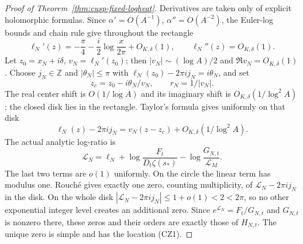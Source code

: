 \documentclass[11pt]{article}
\theoremstyle{remark}\newtheorem{remark}[theorem]{Remark}
\begin{document}
\begin{proof}[Proof of Theorem~\ref{thm:cusp-fixed-logheat}]
Derivatives are taken only of explicit holomorphic formulas.
Since $\alpha'=O(A^{-1})$, $\alpha''=O(A^{-2})$, the Euler-log
bounds and chain rule give throughout the rectangle
\[
 \ell_N'(z)=-\frac\pi4-\frac i2\log\frac{x}{2\pi}+O_{K,\delta}(1),
 \qquad \ell_N''(z)=O_{K,\delta}(1).                   \tag{PHD}
\]
Let $z_0=x_N+i\delta$, $v_N=\ell_N'(z_0)$; then
$|v_N|\sim(\log A)/2$ and $\Re v_N=O_{K,\delta}(1)$.
Choose $j_N\in\mathbb Z$ and $|\theta_N|\le\pi$ with
$\ell_N(z_0)-2\pi i j_N=i\theta_N$, and set
\[
 z_c=z_0-i\theta_N/v_N,\qquad r_N=1/|v_N|.
\]
The real center shift is $O(1/\log A)$ and its imaginary shift
is $O_{K,\delta}(1/\log^2 A)$; the closed disk lies in the rectangle.
Taylor's formula gives uniformly on that disk
\[
 \ell_N(z)-2\pi i j_N=v_N(z-z_c)+O_{K,\delta}(1/\log^2 A).
\]
The actual analytic log-ratio is
\[
 \mathcal L_N=\ell_N+
       \log\frac{F_t}{D_t\zeta(s_*)}
       -\log\frac{G_{N,t}}{\mathcal L_M}.
\]
The last two terms are $o(1)$ uniformly. On the circle the linear
term has modulus one. Rouch\'e gives exactly one zero, counting
multiplicity, of $\mathcal L_N-2\pi i j_N$ in the disk.
On the whole disk $|\mathcal L_N-2\pi i j_N|\le1+o(1)<2<2\pi$,
so no other exponential integer level creates an additional zero.
Since $e^{\mathcal L_N}=F_t/G_{N,t}$ and $G_{N,t}$ is nonzero there,
these zeros and their orders are exactly those of $H_{N,t}$.
The unique zero is simple and has the location (CZ1).
\end{proof}
\end{document}
